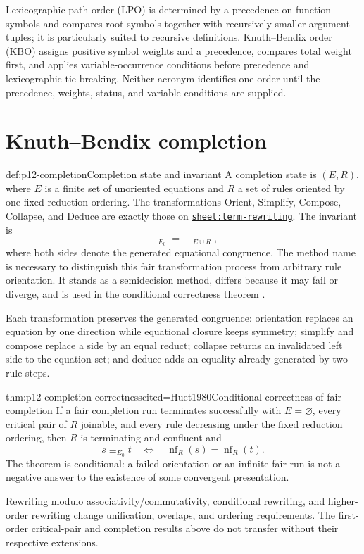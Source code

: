 Lexicographic path order (LPO) is determined by a precedence on function
symbols and compares root symbols together with recursively smaller argument
tuples; it is particularly suited to recursive definitions. Knuth--Bendix
order (KBO) assigns positive symbol weights and a precedence, compares total
weight first, and applies variable-occurrence conditions before precedence and
lexicographic tie-breaking. Neither acronym identifies one order until the
precedence, weights, status, and variable conditions are supplied.

\section{Knuth--Bendix completion}

\begin{hbmethod}{def:p12-completion}{Completion state and invariant}
A completion state is \((E,R)\), where \(E\) is a finite set of unoriented
equations and \(R\) a set of rules oriented by one fixed reduction ordering.
The transformations Orient, Simplify, Compose, Collapse, and Deduce are exactly
those on \hyperref[sheet:term-rewriting]{\texttt{sheet:term-rewriting}}. The
invariant is
\[
 \equiv_{E_0}=\equiv_{E\cup R},
\]
where both sides denote the generated equational congruence. The method name
is necessary to distinguish this fair transformation process from arbitrary
rule orientation. It stands as a semidecision method, differs because it may
fail or diverge, and is used in the conditional correctness theorem
\cite{KnuthBendix1970}.
\end{hbmethod}

Each transformation preserves the generated congruence: orientation replaces
an equation by one direction while equational closure keeps symmetry; simplify
and compose replace a side by an equal reduct; collapse returns an invalidated
left side to the equation set; and deduce adds an equality already generated by
two rule steps.

\begin{hbtheorem}{thm:p12-completion-correctness}{cited=Huet1980}{Conditional correctness of fair completion}
If a fair completion run terminates successfully with \(E=\varnothing\), every
critical pair of \(R\) joinable, and every rule decreasing under the fixed
reduction ordering, then \(R\) is terminating and confluent and
\[
 s\equiv_{E_0}t
 \quad\Longleftrightarrow\quad
 \operatorname{nf}_R(s)=\operatorname{nf}_R(t).
\]
The theorem is conditional: a failed orientation or an infinite fair run is
not a negative answer to the existence of some convergent presentation.
\end{hbtheorem}

Rewriting modulo associativity/commutativity, conditional rewriting, and
higher-order rewriting change unification, overlaps, and ordering requirements.
The first-order critical-pair and completion results above do not transfer
without their respective extensions.
